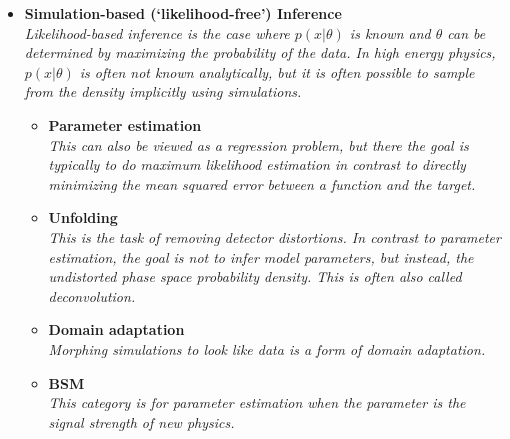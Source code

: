 \documentclass[12pt,letterpaper]{article}
\begin{document}
\begin{itemize}
\item \textbf{Simulation-based (`likelihood-free') Inference}
\\\textit{Likelihood-based inference is the case where $p(x|\theta)$ is known and $\theta$ can be determined by maximizing the probability of the data.  In high energy physics, $p(x|\theta)$ is often not known analytically, but it is often possible to sample from the density implicitly using simulations.}
	\begin{itemize}
		\item \textbf{Parameter estimation}~\cite{Andreassen:2019nnm,Stoye:2018ovl,Hollingsworth:2020kjg,Brehmer:2018kdj,Brehmer:2018eca,Brehmer:2019xox,Brehmer:2018hga,Cranmer:2015bka,Andreassen:2020gtw,Coogan:2020yux,Flesher:2020kuy,Bieringer:2020tnw,Nachman:2021yvi,Chatterjee:2021nms,NEURIPS2020_a878dbeb,Mishra-Sharma:2021oxe,Barman:2021yfh,Bahl:2021dnc,Arganda:2022qzy,Kong:2022rnd,Arganda:2022zbs,Rizvi:2023mws,Heinrich:2023bmt,Morandini:2023pwj,Barrue:2023ysk}
		\\\textit{This can also be viewed as a regression problem, but there the goal is typically to do maximum likelihood estimation in contrast to directly minimizing the mean squared error between a function and the target.}
		\item \textbf{Unfolding}~\cite{Andreassen:2019cjw,Datta:2018mwd,Bellagente:2019uyp,Gagunashvili:2010zw,Glazov:2017vni,Martschei:2012pr,Lindemann:1995ut,Zech2003BinningFreeUB,1800956,Vandegar:2020yvw,Howard:2021pos,Baron:2021vvl,Andreassen:2021zzk,Komiske:2021vym,H1:2021wkz,Arratia:2021otl,Wong:2021zvv,Arratia:2022wny,Backes:2022vmn,Chan:2023tbf,Shmakov:2023kjj}
		\\\textit{This is the task of removing detector distortions.  In contrast to parameter estimation, the goal is not to infer model parameters, but instead, the undistorted phase space probability density.  This is often also called deconvolution.}
		\item \textbf{Domain adaptation}~\cite{Rogozhnikov:2016bdp,Andreassen:2019nnm,Cranmer:2015bka,2009.03796,Nachman:2021opi,Camaiani:2022kul,Schreck:2023pzs,Algren:2023qnb}
		\\\textit{Morphing simulations to look like data is a form of domain adaptation.}
		\item \textbf{BSM}~\cite{Andreassen:2020nkr,Hollingsworth:2020kjg,Brehmer:2018kdj,Brehmer:2018eca,Brehmer:2018hga,Brehmer:2019xox,Romao:2020ojy,deSouza:2022uhk,GomezAmbrosio:2022mpm,Castro:2022zpq,Anisha:2023xmh,Dennis:2023kfe}
		\\\textit{This category is for parameter estimation when the parameter is the signal strength of new physics.}

\end{itemize}
\end{itemize}
\end{document}
